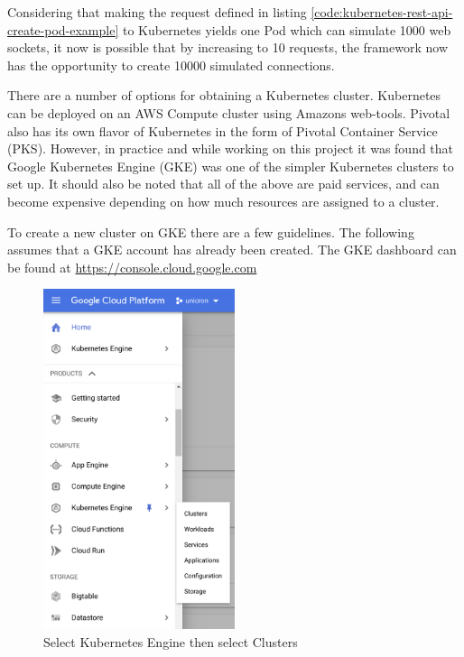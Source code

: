 Considering that making the request defined in listing \ref{code:kubernetes-rest-api-create-pod-example} to Kubernetes yields one Pod which can simulate 1000 web sockets, it now is possible that by increasing to 10 requests, the framework now has the opportunity to create 10000 simulated connections.

There are a number of options for obtaining a Kubernetes cluster. Kubernetes can be deployed on an AWS Compute cluster using Amazons web-tools. Pivotal also has its own flavor of Kubernetes in the form of Pivotal Container Service (PKS)\cite{pks}. However, in practice and while working on this project it was found that Google Kubernetes Engine (GKE) was one of the simpler Kubernetes clusters to set up. It should also be noted that all of the above are paid services, and can become expensive depending on how much resources are assigned to a cluster. 

To create a new cluster on GKE there are a few guidelines. The following assumes that a GKE account has already been created. The GKE dashboard can be found at \href{https://console.cloud.google.com}{https://console.cloud.google.com}

\begin{figure}[!h]
  \centering
    \includegraphics[width=0.5\textwidth]{figures/gke-setup-1.png}
    \caption{Select Kubernetes Engine then select Clusters}
    \label{fig:gke-setup-step-1}
\end{figure}

